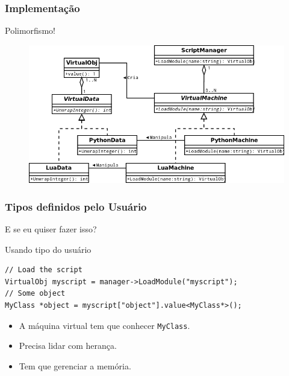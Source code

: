 \documentclass[brazil]{beamer}
\begin{document}
\begin{frame}[fragile]
  \frametitle{Implementação}
  \pause
  \begin{center}
    \Large
    Polimorfismo!
  \end{center}
  \pause
  \vspace{-1em}
  \begin{figure}
    \includegraphics[width=.9\textwidth]{images/implementation.png}
  \end{figure}
\end{frame}
\begin{frame}[fragile]
  \frametitle{Tipos definidos pelo Usuário}
  \pause
  E se eu quiser fazer isso?
  \pause
  \begin{block}{Usando tipo do usuário}
    \begin{lstlisting}
// Load the script
VirtualObj myscript = manager->LoadModule("myscript");
// Some object
MyClass *object = myscript["object"].value<MyClass*>();
    \end{lstlisting}
  \end{block}
  \begin{itemize}
    \pause
    \item A máquina virtual tem que conhecer \texttt{MyClass}.
    \pause
    \item Precisa lidar com herança.
    \pause
    \item Tem que gerenciar a memória.
  \end{itemize}
\end{frame}
\end{document}
